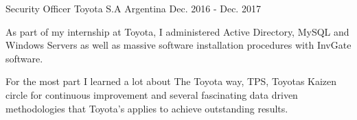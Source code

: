 \begin{cventries}


\cventry
{Security Officer} %
{Toyota S.A} %
{Argentina} %
{Dec. 2016 - Dec. 2017} %
{
\begin{cvitems} %
\item {As part of my internship at Toyota, I administered Active Directory, MySQL and Windows Servers as well as massive software installation procedures with InvGate software.}
\item {For the most part I learned a lot about The Toyota way, TPS, Toyotas Kaizen circle for continuous improvement and several fascinating data driven methodologies that Toyota's applies to achieve outstanding results.}
\end{cvitems}
}
\end{cventries}
